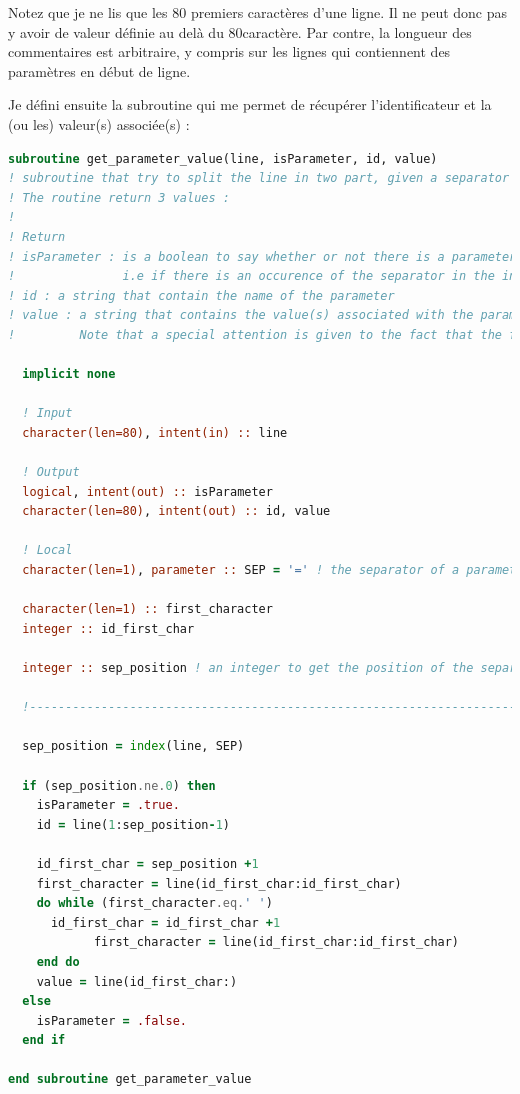 \documentclass[a4paper,twoside]{article}
\begin{document}
\begin{attention}
Notez que je ne lis que les 80 premiers caractères d'une ligne. Il ne peut donc pas y avoir de valeur définie au delà du 80\ieme caractère. Par contre, la longueur des commentaires est arbitraire, y compris sur les lignes qui contiennent des paramètres en début de ligne.
\end{attention}


Je défini ensuite la subroutine qui me permet de récupérer l'identificateur et la (ou les) valeur(s) associée(s) : 
\begin{lstlisting}[language=Fortran]
subroutine get_parameter_value(line, isParameter, id, value)
! subroutine that try to split the line in two part, given a separator value (set in parameter of the subroutine)
! The routine return 3 values : 
!
! Return
! isParameter : is a boolean to say whether or not there is a parameter on this line. 
!               i.e if there is an occurence of the separator in the input line
! id : a string that contain the name of the parameter
! value : a string that contains the value(s) associated with the parameter name. 
!         Note that a special attention is given to the fact that the first character of 'value' must NOT be a 'space'

  implicit none
  
  ! Input
  character(len=80), intent(in) :: line
  
  ! Output
  logical, intent(out) :: isParameter
  character(len=80), intent(out) :: id, value
  
  ! Local
  character(len=1), parameter :: SEP = '=' ! the separator of a parameter line
  
  character(len=1) :: first_character
  integer :: id_first_char

  integer :: sep_position ! an integer to get the position of the separator

  !------------------------------------------------------------------------------

  sep_position = index(line, SEP)
  
  if (sep_position.ne.0) then
    isParameter = .true.
    id = line(1:sep_position-1)
    
    id_first_char = sep_position +1
    first_character = line(id_first_char:id_first_char)
    do while (first_character.eq.' ')
      id_first_char = id_first_char +1
			first_character = line(id_first_char:id_first_char)
    end do
    value = line(id_first_char:)
  else
    isParameter = .false.
  end if

end subroutine get_parameter_value
\end{lstlisting}
\end{document}
